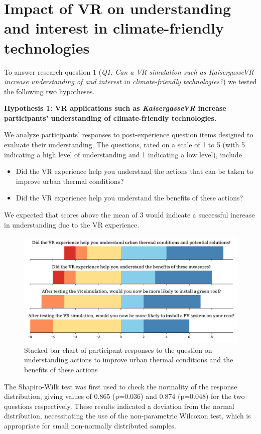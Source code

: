 \documentclass[draft, final]{vutinfth} %
\begin{document}
\section{Impact of VR on understanding and interest in climate-friendly technologies}

To answer research question 1 (\textit{Q1: Can a VR simulation such as \textit{KaisergasseVR} increase understanding of and interest in climate-friendly technologies?}) we tested the following two hypotheses.

\textbf{Hypothesis 1: VR applications such as \textit{KaisergasseVR} increase participants' understanding of climate-friendly technologies.} 

We analyze participants' responses to post-experience question items designed to evaluate their understanding. The questions, rated on a scale of 1 to 5 (with 5 indicating a high level of understanding and 1 indicating a low level), include
\begin{itemize}
    \item Did the VR experience help you understand the actions that can be taken to improve urban thermal conditions?
    \item Did the VR experience help you understand the benefits of these actions?
\end{itemize}
We expected that scores above the mean of 3 would indicate a successful increase in understanding due to the VR experience.

\begin{figure}[h]
    \centering
    \includegraphics[width=\textwidth]{graphics/research-1.pdf}
    \caption{Stacked bar chart of participant responses to the question on understanding actions to improve urban thermal conditions and the benefits of these actions}
    \label{fig:research-1}
\end{figure}

The Shapiro-Wilk test was first used to check the normality of the response distribution, giving values of 0.865 (p=0.036) and 0.874 (p=0.048) for the two questions respectively. These results indicated a deviation from the normal distribution, necessitating the use of the non-parametric Wilcoxon test, which is appropriate for small non-normally distributed samples.
\end{document}
